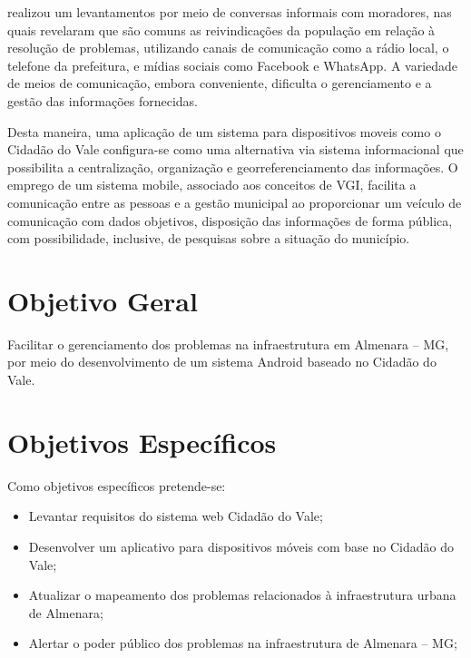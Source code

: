   realizou um levantamentos por meio de conversas informais com moradores, nas quais revelaram que são comuns as reivindicações da população em relação à resolução de problemas, utilizando canais de comunicação como a rádio local, o telefone da prefeitura, e mídias sociais como Facebook e WhatsApp. A variedade de meios de comunicação, embora conveniente, dificulta o gerenciamento e a gestão das informações fornecidas. 

 Desta maneira, uma aplicação de um sistema para dispositivos moveis como o Cidadão do Vale configura-se como uma alternativa via sistema informacional que possibilita a centralização, organização e georreferenciamento das informações. O emprego de um sistema mobile, associado aos conceitos de VGI, facilita a comunicação entre as pessoas e a gestão municipal ao proporcionar um veículo de comunicação com dados objetivos, disposição das informações de forma pública, com possibilidade, inclusive, de pesquisas sobre a situação do município.

\section*{Objetivo Geral} 
Facilitar o gerenciamento dos problemas na infraestrutura em Almenara – MG, por meio do desenvolvimento de um sistema Android baseado no Cidadão do Vale.
	
\section*{Objetivos Específicos}

\begin{flushleft}
	Como objetivos específicos pretende-se:
\end{flushleft}
\begin{itemize}
	\item Levantar requisitos do sistema web Cidadão do Vale;
	\item Desenvolver um aplicativo para dispositivos móveis com base no Cidadão do Vale;
	\item Atualizar o mapeamento dos problemas relacionados à infraestrutura urbana de Almenara;
	\item Alertar o poder público dos problemas na infraestrutura de Almenara – MG;
\end{itemize}

